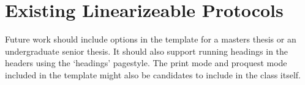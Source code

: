 \section{Existing Linearizeable Protocols}

Future work should include options in the template for a masters thesis or an undergraduate senior thesis. It should also support running headings in the headers using the `headings' pagestyle.  The print mode and proquest mode included in the template might also be candidates to include in the class itself. 

 